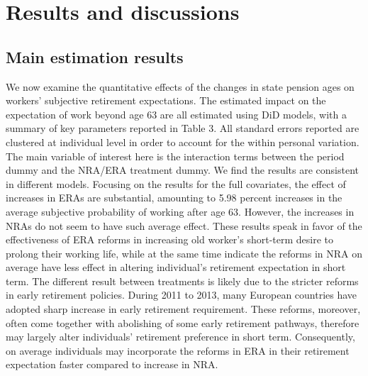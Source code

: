 \documentclass[a4paper]{article}
\begin{document}
\section{Results and discussions}
\subsection{Main estimation results}

We now examine the quantitative effects of the changes in state pension ages on workers’ subjective retirement expectations. The estimated impact on the expectation of work beyond age 63 are all estimated using DiD models, with a summary of key parameters reported in Table 3. All standard errors reported are clustered at individual level in order to account for the within personal variation. The main variable of interest here is the interaction terms between the period dummy and the NRA/ERA treatment dummy. We find the results are consistent in different models. Focusing on the results for the full covariates, the effect of increases in ERAs are substantial, amounting to 5.98 percent increases in the average subjective probability of working after age 63. However, the increases in NRAs do not seem to have such average effect. These results speak in favor of the effectiveness of ERA reforms in increasing old worker’s short-term desire to prolong their working life, while at the same time indicate the reforms in NRA on average have less effect in altering individual’s retirement expectation in short term. The different result between treatments is likely due to the stricter reforms in early retirement policies. During 2011 to 2013, many European countries have adopted sharp increase in early retirement requirement. These reforms, moreover, often come together with abolishing of some early retirement pathways, therefore may largely alter individuals’ retirement preference in short term. Consequently, on average individuals may incorporate the reforms in ERA in their retirement expectation faster compared to increase in NRA.
\end{document}
